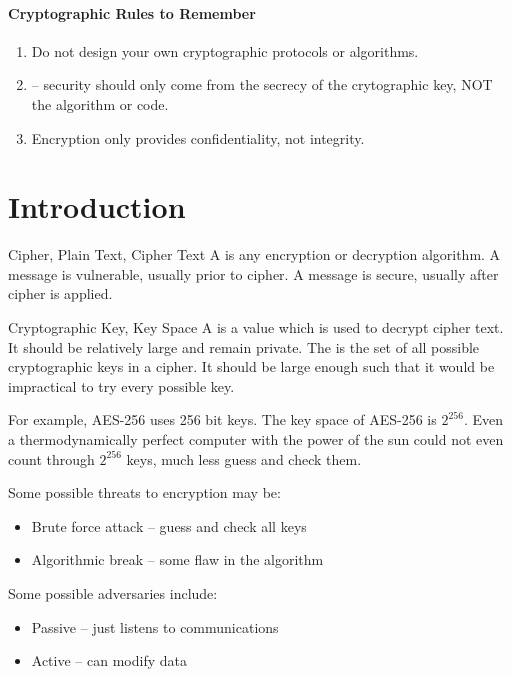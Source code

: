 \documentclass[code]{amznotes}
\begin{document}
\paragraph{Cryptographic Rules to Remember}
\begin{enumerate}[noitemsep]
    \item Do not design your own cryptographic protocols or algorithms.
    \item {} -- security should only come from the secrecy of the crytographic key, NOT the algorithm or code.
    \item Encryption only provides confidentiality, not integrity.
\end{enumerate}

\section{Introduction}

\begin{dfnbox}{Cipher, Plain Text, Cipher Text}{}
    A  is any encryption or decryption algorithm. A  message is vulnerable, usually prior to cipher. A  message is secure, usually after cipher is applied.
\end{dfnbox}

\begin{dfnbox}{Cryptographic Key, Key Space}{}
    A  is a value which is used to decrypt cipher text. It should be relatively large and remain private. The  is the set of all possible cryptographic keys in a cipher. It should be large enough such that it would be impractical to try every possible key.
\end{dfnbox}

 For example, AES-256 uses 256 bit keys. The key space of AES-256 is $2^{256}$. Even a thermodynamically perfect computer with the power of the sun could not even count through $2^{256}$ keys, much less guess and check them.

Some possible threats to encryption may be:
\begin{itemize}[noitemsep]
    \item Brute force attack -- guess and check all keys
    \item Algorithmic break -- some flaw in the algorithm
\end{itemize}

Some possible adversaries include:
\begin{itemize}[noitemsep]
    \item Passive -- just listens to communications
    \item Active -- can modify data
\end{itemize}
\end{document}
